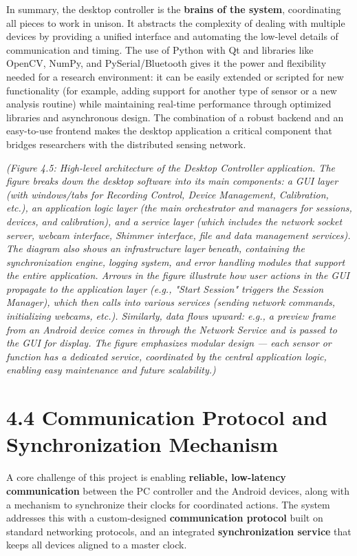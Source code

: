 In summary, the desktop controller is the \textbf{brains of the system},
coordinating all pieces to work in unison. It abstracts the complexity
of dealing with multiple devices by providing a unified interface and
automating the low-level details of communication and timing. The use of
Python with Qt and libraries like OpenCV, NumPy, and PySerial/Bluetooth
gives it the power and flexibility needed for a research environment: it
can be easily extended or scripted for new functionality (for example,
adding support for another type of sensor or a new analysis routine)
while maintaining real-time performance through optimized libraries and
asynchronous design. The combination of a robust backend and an
easy-to-use frontend makes the desktop application a critical component
that bridges researchers with the distributed sensing network.

\textit{(Figure 4.5: High-level architecture of the Desktop Controller
application. The figure breaks down the desktop software into its main
components: a} \textit{GUI layer} \textit{(with windows/tabs for Recording Control,
Device Management, Calibration, etc.), an} \textit{application logic layer}
\textit{(the main orchestrator and managers for sessions, devices, and
calibration), and a} \textit{service layer} \textit{(which includes the network socket
server, webcam interface, Shimmer interface, file and data management
services). The diagram also shows an} \textit{infrastructure layer} \textit{beneath,
containing the synchronization engine, logging system, and error
handling modules that support the entire application. Arrows in the
figure illustrate how user actions in the GUI propagate to the
application layer (e.g., "Start Session" triggers the Session Manager),
which then calls into various services (sending network commands,
initializing webcams, etc.). Similarly, data flows upward: e.g., a
preview frame from an Android device comes in through the Network
Service and is passed to the GUI for display. The figure emphasizes
modular design --- each sensor or function has a dedicated service,
coordinated by the central application logic, enabling easy maintenance
and future scalability.)}

\section{4.4 Communication Protocol and Synchronization Mechanism}

A core challenge of this project is enabling \textbf{reliable, low-latency
communication} between the PC controller and the Android devices, along
with a mechanism to synchronize their clocks for coordinated actions.
The system addresses this with a custom-designed \textbf{communication
protocol} built on standard networking protocols, and an integrated
\textbf{synchronization service} that keeps all devices aligned to a master
clock.

